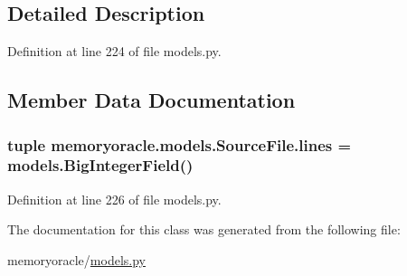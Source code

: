 \subsection{Detailed Description}


Definition at line 224 of file models.\+py.



\subsection{Member Data Documentation}
\hypertarget{classmemoryoracle_1_1models_1_1SourceFile_a67c7948f0afb40167c0474afb6ac59c5}{}
\subsubsection[{lines}]{\setlength{\rightskip}{0pt plus 5cm}tuple memoryoracle.\+models.\+Source\+File.\+lines = models.\+Big\+Integer\+Field()\hspace{0.3cm}{\ttfamily [static]}}\label{classmemoryoracle_1_1models_1_1SourceFile_a67c7948f0afb40167c0474afb6ac59c5}


Definition at line 226 of file models.\+py.



The documentation for this class was generated from the following file\+:\begin{DoxyCompactItemize}
\item 
memoryoracle/\hyperlink{models_8py}{models.\+py}\end{DoxyCompactItemize}
